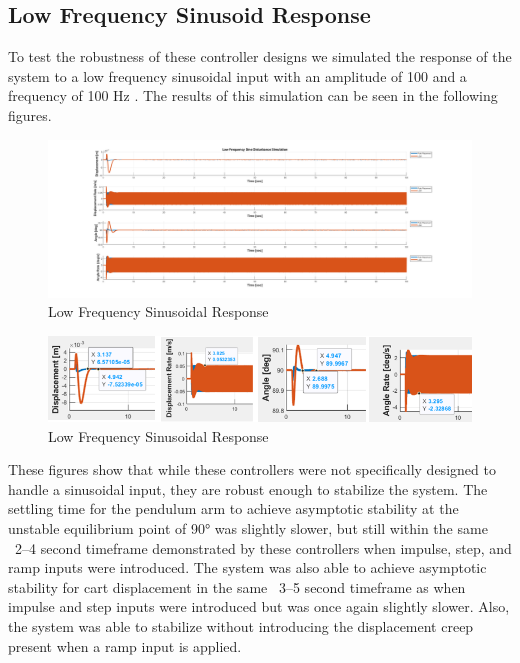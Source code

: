 \documentclass[titlepage]{article}
\begin{document}
\subsection{Low Frequency Sinusoid Response}
To test the robustness of these controller designs we simulated the response of the system to a low frequency sinusoidal input with an amplitude of 100  and a frequency of 100 Hz .
The results of this simulation can be seen in the following figures.

\begin{figure}[h]
    \includegraphics[width=1\linewidth]{low_frequency_sine.png}
    \caption{Low Frequency Sinusoidal Response}
    \label{fig:enter-label}
\end{figure}

\begin{figure}[h]
    \includegraphics[width=1\linewidth]{eddie_fig_1.png}
    \caption{Low Frequency Sinusoidal Response}
    \label{fig:enter-label}
\end{figure}

These figures show that while these controllers were not specifically designed to handle a sinusoidal input, they are robust enough to stabilize the system. The settling time for the pendulum arm to achieve asymptotic stability at the unstable equilibrium point of 90° was slightly slower, but still within the same ~2–4 second timeframe demonstrated by these controllers when impulse, step, and ramp inputs were introduced. The system was also able to achieve asymptotic stability for cart displacement in the same ~3–5 second timeframe as when impulse and step inputs were introduced but was once again slightly slower. Also, the system was able to stabilize without introducing the displacement creep present when a ramp input is applied.\\
\end{document}
